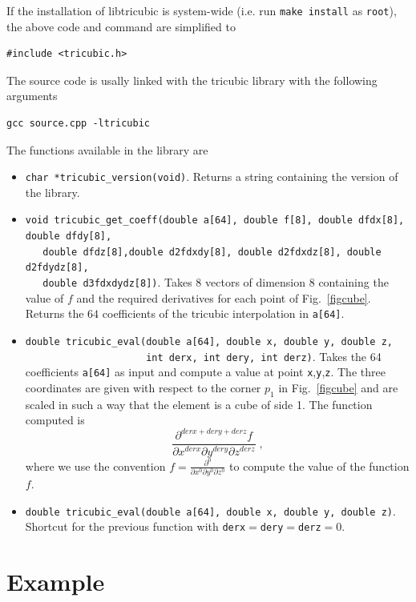 \documentclass{article}
\begin{document}
\noindent If the installation of libtricubic is system-wide (i.e. run \verb+make install+ as \verb+root+), the above code and command are simplified to
\begin{verbatim}
#include <tricubic.h>
\end{verbatim}
The source code is usally linked with the tricubic library with the following arguments
\begin{verbatim}
gcc source.cpp -ltricubic
\end{verbatim}

\noindent The functions available in the library are
\begin{itemize}
\item \verb+char *tricubic_version(void)+. Returns a string containing the version of the library.
\item \verb+void tricubic_get_coeff(double a[64], double f[8], double dfdx[8], double dfdy[8],+\\\verb+   double dfdz[8],double d2fdxdy[8], double d2fdxdz[8], double d2fdydz[8],+\\\verb+   double d3fdxdydz[8])+. Takes 8 vectors of dimension $8$ containing the value of $f$ and the required derivatives for each point of Fig.~\ref{figcube}. Returns the $64$ coefficients of the tricubic interpolation in \verb+a[64]+.
\item \verb+double tricubic_eval(double a[64], double x, double y, double z,+\\\verb+                     int derx, int dery, int derz)+. Takes the 64 coefficients \verb+a[64]+ as input and compute a value at point \verb+x+,\verb+y+,\verb+z+. The three coordinates are given with respect to the corner $p_1$ in Fig.~\ref{figcube} and are scaled in such a way that the element is a cube of side 1. The function computed is \begin{equation}
\frac{\partial ^{derx+dery+derz} f}{\partial x^{derx} \partial y^{dery} \partial z^{derz}} \; ,
\end{equation} where we use the convention $f = \frac{\partial ^0}{\partial x^0 \partial y^0  \partial z^0 }$ to compute the value of the function $f$.
\item \verb+double tricubic_eval(double a[64], double x, double y, double z)+. Shortcut for the previous function with \verb+derx+$=$\verb+dery+$=$\verb+derz+$=0$.
\end{itemize}

\section{Example}
\end{document}
